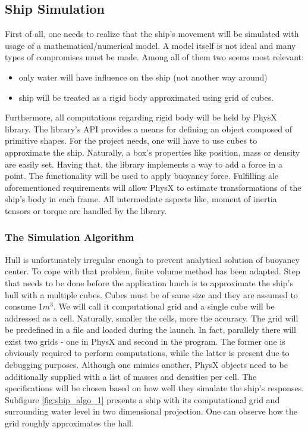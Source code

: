 \documentclass{report}
\begin{document}
\subsection{Ship Simulation} \label{subsec:ship_simulation}
First of all, one needs to realize that the ship's movement will be simulated with
usage of a mathematical/numerical model. A model itself is not ideal and many types of compromises must be made. Among all of them two seems most relevant: 
\begin{itemize}
\item only water will have influence on the ship (not another way around)
\item ship will be treated as a rigid body approximated using grid of cubes. 
\end{itemize} 
Furthermore, all computations regarding rigid body will be held by PhysX library. The library's API provides a means for defining an object composed of primitive shapes. For the project needs, one will have to use cubes to approximate the ship. Naturally, a box's properties like position, mass or density are easily set.
Having that, the library implements a way to add a force in a point. The functionality will be used to apply buoyancy force. Fulfilling ale aforementioned requirements will allow PhysX to estimate transformations of the ship's body in each frame. All intermediate aspects like, moment of inertia tensors or torque are handled by the library.

\subsubsection{The Simulation Algorithm}
Hull is unfortunately irregular enough to prevent analytical solution of buoyancy center. To cope with that problem, finite volume method has been adapted. Step that needs to be done before the application lunch is to approximate the ship's hull with a multiple cubes. Cubes must be of same size and they are assumed to consume 1$m^3$. We will call it computational grid and a single cube will be addressed as a cell. Naturally, smaller the cells, more the accuracy. The grid will be predefined in a file and loaded during the launch. In fact, parallely there will exist two grids - one in PhysX and second in the program. The former one is obviously required to perform computations, while the latter is present due to debugging purposes. Although one mimics another, PhysX objects need to be additionally supplied with a list of masses and densities per cell. The specifications will be chosen based on how well they simulate the ship's responses. Subfigure \ref{fig:ship_algo_1} presents a ship with its computational grid and surrounding water level in two dimensional projection. One can observe how the grid roughly approximates the hall.   
\end{document}
